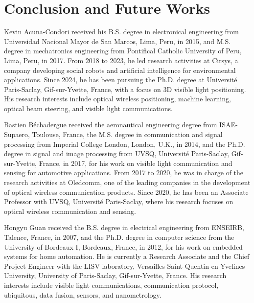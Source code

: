 \documentclass[journal]{IEEEtran}
\begin{document}
\section{Conclusion and Future Works}













\cite{Acuna2025,acuna2026robust,acuna2025model}



\begin{IEEEbiographynophoto}{Kevin Acuna-Condori}
received his B.S. degree in electronical engineering from Universidad Nacional Mayor de San Marcos, Lima, Peru, in 2015, and M.S. degree in mechatronics engineering from Pontifical Catholic University of Peru, Lima, Peru, in 2017. 
From 2018 to 2023, he led research activities at Cirsys, a company developing social robots and artificial intelligence for environmental applications.
Since 2024, he has been pursuing the Ph.D. degree at Université Paris-Saclay, Gif-sur-Yvette, France, with a focus on 3D visible light positioning.
His research interests include optical wireless positioning, machine learning, optical beam steering, and visible light communications.
\end{IEEEbiographynophoto}

\begin{IEEEbiographynophoto}{Bastien Béchadergue}
received the aeronautical engineering degree from ISAE-Supaero, Toulouse, France, the M.S. degree in communication and signal processing from Imperial College London, London, U.K., in 2014, and the Ph.D. degree in signal and image processing from UVSQ, Université Paris-Saclay, Gif-sur-Yvette, France, in 2017, for his work on visible light communication and sensing for automotive applications. From 2017 to 2020, he was in charge of the research activities at Oledcomm, one of the leading companies in the development of optical wireless communication products. Since 2020, he has been an Associate Professor with UVSQ, Université Paris-Saclay, where his research focuses on optical wireless communication and sensing.
\end{IEEEbiographynophoto}

\begin{IEEEbiographynophoto}{Hongyu Guan}
received the B.S. degree in electrical engineering from ENSEIRB, Talence, France, in 2007, and the Ph.D. degree in computer science from the University of Bordeaux I, Bordeaux, France, in 2012, for his work on embedded systems for home automation. He is currently a Research Associate and the Chief Project Engineer with the LISV laboratory, Versailles Saint-Quentin-en-Yvelines University, University of Paris-Saclay, Gif-sur-Yvette, France. His research interests include visible light communications, communication protocol, ubiquitous, data fusion, sensors, and nanometrology.
\end{IEEEbiographynophoto}
\end{document}
